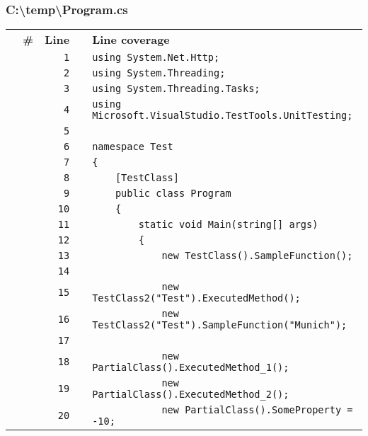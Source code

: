 \documentclass[a4paper,landscape,10pt]{article}
\begin{document}
\subsubsection{C:\textbackslash temp\textbackslash Program.cs}
\begin{longtable}[l]{lrrll}
\textbf{} & \textbf{\#} & \textbf{Line} & \textbf{} & \textbf{Line coverage}\\
\cellcolor{gray} &  & \verb~1~ & & \verb~using System.Net.Http;~\\
\cellcolor{gray} &  & \verb~2~ & & \verb~using System.Threading;~\\
\cellcolor{gray} &  & \verb~3~ & & \verb~using System.Threading.Tasks;~\\
\cellcolor{gray} &  & \verb~4~ & & \verb~using Microsoft.VisualStudio.TestTools.UnitTesting;~\\
\cellcolor{gray} &  & \verb~5~ & & \verb~~\\
\cellcolor{gray} &  & \verb~6~ & & \verb~namespace Test~\\
\cellcolor{gray} &  & \verb~7~ & & \verb~{~\\
\cellcolor{gray} &  & \verb~8~ & & \verb~    [TestClass]~\\
\cellcolor{gray} &  & \verb~9~ & & \verb~    public class Program~\\
\cellcolor{gray} &  & \verb~10~ & & \verb~    {~\\
\cellcolor{gray} &  & \verb~11~ & & \verb~        static void Main(string[] args)~\\
\cellcolor{gray} &  & \verb~12~ & & \verb~        {~\\
\cellcolor{gray} &  & \verb~13~ & & \verb~            new TestClass().SampleFunction();~\\
\cellcolor{gray} &  & \verb~14~ & & \verb~~\\
\cellcolor{gray} &  & \verb~15~ & & \verb~            new TestClass2("Test").ExecutedMethod();~\\
\cellcolor{gray} &  & \verb~16~ & & \verb~            new TestClass2("Test").SampleFunction("Munich");~\\
\cellcolor{gray} &  & \verb~17~ & & \verb~~\\
\cellcolor{gray} &  & \verb~18~ & & \verb~            new PartialClass().ExecutedMethod_1();~\\
\cellcolor{gray} &  & \verb~19~ & & \verb~            new PartialClass().ExecutedMethod_2();~\\
\cellcolor{gray} &  & \verb~20~ & & \verb~            new PartialClass().SomeProperty = -10;~\\

\end{longtable}
\end{document}
